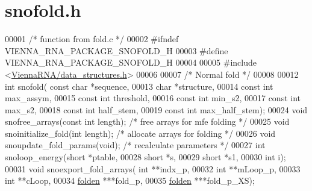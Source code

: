 \hypertarget{snofold_8h_source}{}\section{snofold.\+h}
\label{snofold_8h_source}

\begin{DoxyCode}
00001 \textcolor{comment}{/* function from fold.c */}
00002 \textcolor{preprocessor}{#ifndef VIENNA\_RNA\_PACKAGE\_SNOFOLD\_H}
00003 \textcolor{preprocessor}{#define VIENNA\_RNA\_PACKAGE\_SNOFOLD\_H}
00004 
00005 \textcolor{preprocessor}{#include <\hyperlink{data__structures_8h}{ViennaRNA/data\_structures.h}>}
00006 
00007 \textcolor{comment}{/* Normal fold */}
00008 
00012 \textcolor{keywordtype}{int}  snofold( \textcolor{keyword}{const} \textcolor{keywordtype}{char} *sequence,
00013     \textcolor{keywordtype}{char} *structure,
00014                 \textcolor{keyword}{const} \textcolor{keywordtype}{int} max\_assym,
00015                 \textcolor{keyword}{const} \textcolor{keywordtype}{int} threshold, 
00016                 \textcolor{keyword}{const} \textcolor{keywordtype}{int} min\_s2,
00017                 \textcolor{keyword}{const} \textcolor{keywordtype}{int} max\_s2,
00018                 \textcolor{keyword}{const} \textcolor{keywordtype}{int} half\_stem,
00019                 \textcolor{keyword}{const} \textcolor{keywordtype}{int} max\_half\_stem);
00024 \textcolor{keywordtype}{void}   snofree\_arrays(\textcolor{keyword}{const} \textcolor{keywordtype}{int} length);  \textcolor{comment}{/* free arrays for mfe folding */}
00025 \textcolor{keywordtype}{void}   snoinitialize\_fold(\textcolor{keywordtype}{int} length);    \textcolor{comment}{/* allocate arrays for folding */}
00026 \textcolor{keywordtype}{void}   snoupdate\_fold\_params(\textcolor{keywordtype}{void});       \textcolor{comment}{/* recalculate parameters */}
00027 \textcolor{keywordtype}{int}    snoloop\_energy(\textcolor{keywordtype}{short} *ptable,
00028                       \textcolor{keywordtype}{short} *s,
00029                       \textcolor{keywordtype}{short} *s1,
00030                       \textcolor{keywordtype}{int} i);
00031 \textcolor{keywordtype}{void}   snoexport\_fold\_arrays( \textcolor{keywordtype}{int} **indx\_p,
00032                               \textcolor{keywordtype}{int} **mLoop\_p,
00033                               \textcolor{keywordtype}{int} **cLoop,
00034                               \hyperlink{group__data__structures_structnode}{folden} ***fold\_p,
00035                               \hyperlink{group__data__structures_structnode}{folden} ***fold\_p\_XS);

\end{DoxyCode}
